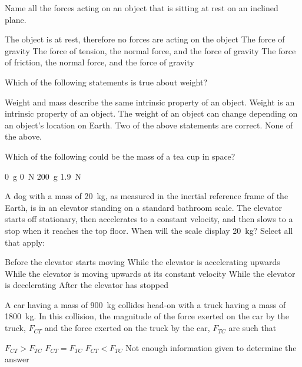 \question Name all the forces acting  on an object that is sitting at rest on an inclined plane.
\begin{checkboxes}
\choice The object is at rest, therefore no forces are acting on the object
\choice The force of gravity
\choice The force of tension, the normal force, and the force of gravity
\CorrectChoice The force of friction, the normal force, and the force of gravity \correct
\end{checkboxes}

\question Which of the following statements is true about weight?
\begin{checkboxes}
\choice Weight and mass describe the same intrinsic property of an object.
\choice Weight is an intrinsic property of an object.
\CorrectChoice The weight of an object can change depending on an object's location on Earth. \correct
\choice Two of the above statements are correct.
\choice None of the above.
\end{checkboxes}

\question Which of the following could be the mass of a tea cup in space?
\begin{checkboxes}
\choice \SI{0}{g}
\choice \SI{0}{N}
\CorrectChoice \SI{200}{g} \correct
\choice \SI{1.9}{N}
\end{checkboxes}


\question A dog with a mass of \SI{20}{kg}, as measured in the inertial reference frame of the Earth, is in an elevator standing on a standard bathroom scale. The elevator starts off stationary, then accelerates to a constant velocity, and then slows to a stop when it reaches the top floor. When will the scale display \SI{20}{kg}? Select all that apply:
\begin{checkboxes}
\CorrectChoice Before the elevator starts moving \correct
\choice While the elevator is accelerating upwards
\CorrectChoice While the elevator is moving upwards at its constant velocity \correct
\choice While the elevator is decelerating
\CorrectChoice After the elevator has stopped \correct
\end{checkboxes}

\question A car having a mass of \SI{900}{kg} collides head-on with a truck having a mass of \SI{1800}{kg}. In this collision, the magnitude of the force exerted on the car by the truck, $F_{CT}$ and the force exerted on the truck by the car, $F_{TC}$ are such that
\begin{checkboxes}
\choice $F_{CT} > F_{TC}$
\CorrectChoice $F_{CT} = F_{TC}$ \correct
\choice $F_{CT} < F_{TC}$
\choice Not enough information given to determine the answer
\end{checkboxes}


